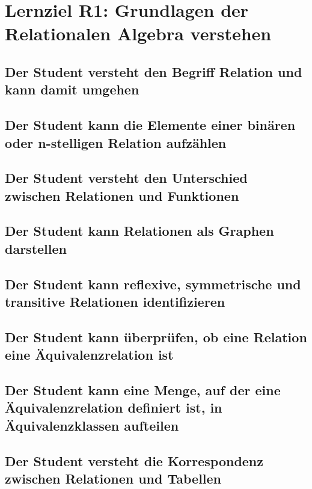 \section{Lernziel R1: Grundlagen der Relationalen Algebra verstehen}

\subsection{Der Student versteht den Begriff Relation und kann damit umgehen}

\subsection{Der Student kann die Elemente einer binären oder n-stelligen Relation aufzählen}

\subsection{Der Student versteht den Unterschied zwischen Relationen und Funktionen}

\subsection{Der Student kann Relationen als Graphen darstellen}

\subsection{Der Student kann reflexive, symmetrische und transitive Relationen identifizieren}

\subsection{Der Student kann überprüfen, ob eine Relation eine Äquivalenzrelation ist}

\subsection{Der Student kann eine Menge, auf der eine Äquivalenzrelation definiert ist, in Äquivalenzklassen aufteilen}

\subsection{Der Student versteht die Korrespondenz zwischen Relationen und Tabellen}
